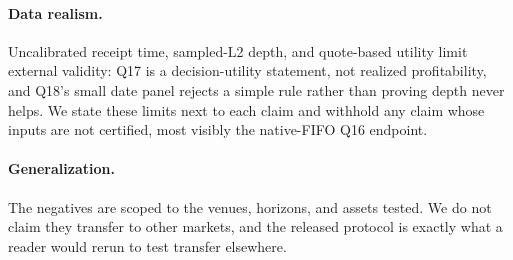 \paragraph{Data realism.} Uncalibrated receipt time, sampled-L2 depth, and quote-based utility
limit external validity: Q17 is a decision-utility statement, not realized profitability, and
Q18's small date panel rejects a simple rule rather than proving depth never helps. We state
these limits next to each claim and withhold any claim whose inputs are not certified, most
visibly the native-FIFO Q16 endpoint.

\paragraph{Generalization.} The negatives are scoped to the venues, horizons, and assets tested.
We do not claim they transfer to other markets, and the released protocol is exactly what a
reader would rerun to test transfer elsewhere.
